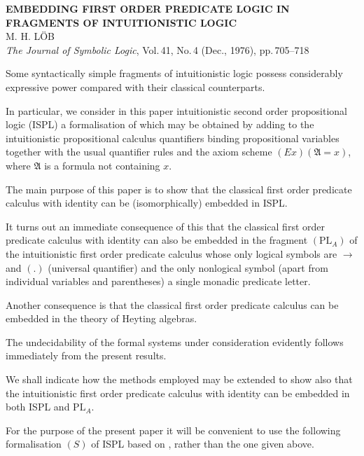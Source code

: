 \documentclass[12pt,a4paper]{article}
\begin{document}
\begin{center}
  {\large\bfseries
    EMBEDDING FIRST ORDER PREDICATE LOGIC IN\\[4pt]
    FRAGMENTS OF INTUITIONISTIC LOGIC}\\[10pt]
  {\large M. H. L\"{O}B}\\[6pt]
  \textit{The Journal of Symbolic Logic},
  Vol.\,41, No.\,4 (Dec., 1976), pp.\,705--718
\end{center}

\bigskip

Some syntactically simple fragments of intuitionistic logic possess
considerably expressive power compared with their classical counterparts.

In particular, we consider in this paper intuitionistic second order
propositional logic (ISPL) a formalisation of which may be obtained by adding
to the intuitionistic propositional calculus quantifiers binding propositional
variables together with the usual quantifier rules and the axiom scheme
$(Ex)(\mathfrak{A} = x)$, where $\mathfrak{A}$ is a formula not containing
$x$.

The main purpose of this paper is to show that the classical first order
predicate calculus with identity can be (isomorphically) embedded in ISPL.

It turns out an immediate consequence of this that the classical first order
predicate calculus with identity can also be embedded in the fragment
$(\mathrm{PL}_A)$ of the intuitionistic first order predicate calculus whose
only logical symbols are $\to$ and $(.)$ (universal quantifier) and the only
nonlogical symbol (apart from individual variables and parentheses) a single
monadic predicate letter.

Another consequence is that the classical first order predicate calculus can
be embedded in the theory of Heyting algebras.

The undecidability of the formal systems under consideration evidently follows
immediately from the present results.

We shall indicate how the methods employed may be extended to show also that
the intuitionistic first order predicate calculus with identity can be embedded
in both ISPL and $\mathrm{PL}_A$.

For the purpose of the present paper it will be convenient to use the
following formalisation $(S)$ of ISPL based on \cite{Schuttif1950}, rather
than the one given above.
\end{document}
